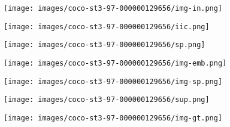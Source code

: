 \documentclass[letterpaper, 10 pt, journal, twoside]{IEEEtran}
\begin{document}
\begin{figure*}[htb]
    \centering
    \begin{subfigure}[t]{0.125\textwidth}
      \texttt{[image: images/coco-st3-97-000000129656/img-in.png]}
    \end{subfigure}
    \begin{subfigure}[t]{0.125\textwidth}
      \texttt{[image: images/coco-st3-97-000000129656/iic.png]}
    \end{subfigure}
    \begin{subfigure}[t]{0.125\textwidth}
      \texttt{[image: images/coco-st3-97-000000129656/sp.png]}
    \end{subfigure}
    \begin{subfigure}[t]{0.125\textwidth}
      \texttt{[image: images/coco-st3-97-000000129656/img-emb.png]}
     \end{subfigure}
    \begin{subfigure}[t]{0.125\textwidth}
      \texttt{[image: images/coco-st3-97-000000129656/img-sp.png]}
    \end{subfigure}
    \begin{subfigure}[t]{0.125\textwidth}
      \texttt{[image: images/coco-st3-97-000000129656/sup.png]}
    \end{subfigure} 
    \begin{subfigure}[t]{0.125\textwidth}
      \texttt{[image: images/coco-st3-97-000000129656/img-gt.png]}
    \end{subfigure}
    

\end{figure*}
\end{document}
